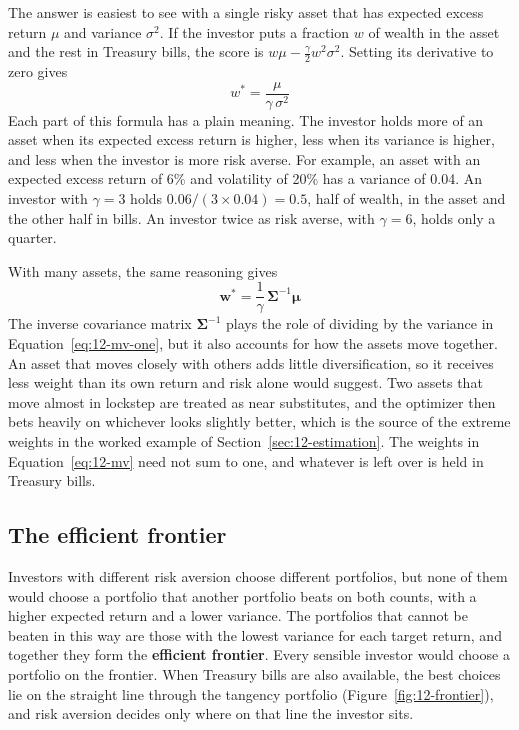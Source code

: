 The answer is easiest to see with a single risky asset that has expected excess return $\mu$ and variance $\sigma^2$. If the investor puts a fraction $w$ of wealth in the asset and the rest in Treasury bills, the score is $w\mu - \tfrac{\gamma}{2} w^2 \sigma^2$. Setting its derivative to zero gives
\begin{equation}
  w^* = \frac{\mu}{\gamma\,\sigma^2}
  \label{eq:12-mv-one}
\end{equation}
Each part of this formula has a plain meaning. The investor holds more of an asset when its expected excess return is higher, less when its variance is higher, and less when the investor is more risk averse. For example, an asset with an expected excess return of 6\% and volatility of 20\% has a variance of 0.04. An investor with $\gamma = 3$ holds $0.06/(3 \times 0.04) = 0.5$, half of wealth, in the asset and the other half in bills. An investor twice as risk averse, with $\gamma = 6$, holds only a quarter.

With many assets, the same reasoning gives
\begin{equation}
  \mathbf{w}^* = \frac{1}{\gamma}\,\boldsymbol{\Sigma}^{-1}\boldsymbol{\mu}
  \label{eq:12-mv}
\end{equation}
The inverse covariance matrix $\boldsymbol{\Sigma}^{-1}$ plays the role of dividing by the variance in Equation~\eqref{eq:12-mv-one}, but it also accounts for how the assets move together. An asset that moves closely with others adds little diversification, so it receives less weight than its own return and risk alone would suggest. Two assets that move almost in lockstep are treated as near substitutes, and the optimizer then bets heavily on whichever looks slightly better, which is the source of the extreme weights in the worked example of Section~\ref{sec:12-estimation}. The weights in Equation~\eqref{eq:12-mv} need not sum to one, and whatever is left over is held in Treasury bills.

\subsection{The efficient frontier}
\label{sec:12-frontier}

Investors with different risk aversion choose different portfolios, but none of them would choose a portfolio that another portfolio beats on both counts, with a higher expected return and a lower variance. The portfolios that cannot be beaten in this way are those with the lowest variance for each target return, and together they form the \textbf{efficient frontier}. Every sensible investor would choose a portfolio on the frontier. When Treasury bills are also available, the best choices lie on the straight line through the tangency portfolio (Figure~\ref{fig:12-frontier}), and risk aversion decides only where on that line the investor sits.

